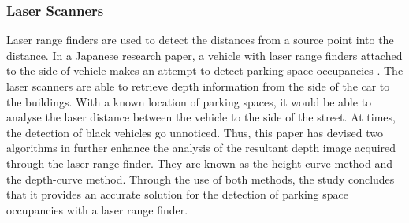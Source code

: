 \subsubsection*{Laser Scanners}
Laser range finders are used to detect the distances from a source point into the distance. In a Japanese research paper, a vehicle with laser range finders attached to the side of vehicle makes an attempt to detect parking space occupancies \citep{ono_probe_2002}. The laser scanners are able to retrieve depth information from the side of the car to the buildings. With a known location of parking spaces, it would be able to analyse the laser distance between the vehicle to the side of the street. At times, the detection of black vehicles go unnoticed. Thus, this paper has devised two algorithms in further enhance the analysis of the resultant depth image acquired through the laser range finder. They are known as the height-curve method and the depth-curve method. Through the use of both methods, the study concludes that it provides an accurate solution for the detection of parking space occupancies with a laser range finder.